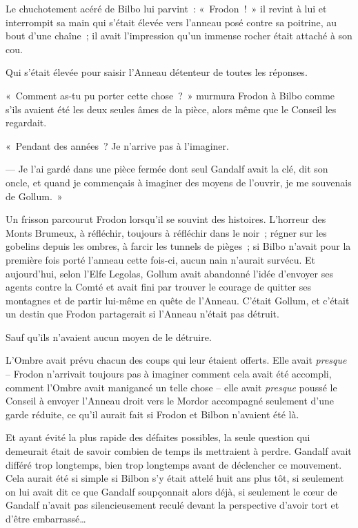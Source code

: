 Le chuchotement acéré de Bilbo lui parvint~: «~Frodon~!~»
 il revint à lui et interrompit sa main qui s'était élevée vers l'anneau posé contre sa poitrine, au bout d'une chaîne~; il avait l'impression qu'un immense rocher était attaché à son cou.

Qui s'était élevée pour saisir l'Anneau détenteur de toutes les réponses.

«~Comment as-tu pu porter cette chose~?~»
murmura Frodon à Bilbo comme s'ils avaient été les deux seules âmes de la pièce, alors même que le Conseil les regardait.

«~Pendant des années~?
Je n'arrive pas à l'imaginer.

--- Je l'ai gardé dans une pièce fermée dont seul Gandalf avait la clé, dit son oncle, et quand je commençais à imaginer des moyens de l'ouvrir, je me souvenais de Gollum.~»

Un frisson parcourut Frodon lorsqu'il se souvint des histoires.
L'horreur des Monts Brumeux, à réfléchir, toujours à réfléchir dans le noir~; régner sur les gobelins depuis les ombres, à farcir les tunnels de pièges~; si Bilbo n'avait pour la première fois porté l'anneau cette fois-ci, aucun nain n'aurait survécu.
Et aujourd'hui, selon l'Elfe Legolas, Gollum avait abandonné l'idée d'envoyer ses agents contre la Comté et avait fini par trouver le courage de quitter ses montagnes et de partir lui-même en quête de l'Anneau.
C'était Gollum, et c'était un destin que Frodon partagerait si l'Anneau n'était pas détruit.

Sauf qu'ils n'avaient aucun moyen de le détruire.

L'Ombre avait prévu chacun des coups qui leur étaient offerts.
Elle avait \emph{presque} -- Frodon n'arrivait toujours pas à imaginer comment cela avait été accompli, comment l'Ombre avait manigancé un telle chose -- elle avait \emph{presque} poussé le Conseil à envoyer l'Anneau droit vers le Mordor accompagné seulement d'une garde réduite, ce qu'il aurait fait si Frodon et Bilbon n'avaient été là.

Et ayant évité la plus rapide des défaites possibles, la seule question qui demeurait était de savoir combien de temps ils mettraient à perdre.
Gandalf avait différé trop longtemps, bien trop longtemps avant de déclencher ce mouvement.
Cela aurait été si simple si Bilbon s'y était attelé huit ans plus tôt, si seulement on lui avait dit ce que Gandalf soupçonnait alors déjà, si seulement le cœur de Gandalf n'avait pas silencieusement reculé devant la perspective d'avoir tort et d'être embarrassé…


